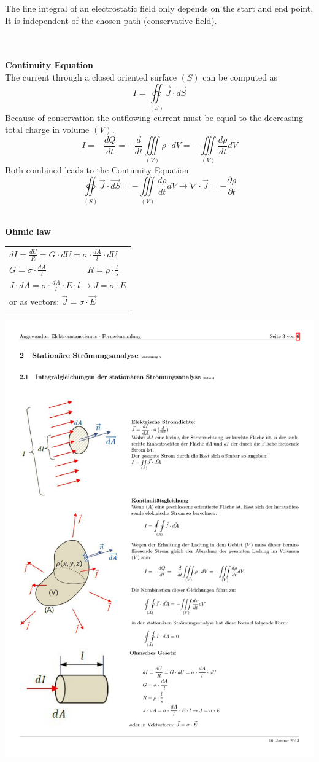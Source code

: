 The line integral of an electrostatic field only depends on the start and end point. It is independent of the chosen path (conservative field).
	
\textbf{\\ \\Continuity Equation\\}
	The current through a closed oriented surface $(S)$ can be computed as
	\begin{equation*}
		I = \oiint\limits_{\left(S\right)} \vec{J} \cdot \vec{dS}
	\end{equation*}
	Because of conservation the outflowing current must be equal to the decreasing total charge in volume $(V)$.
	\begin{equation*}
		I = -\frac{dQ}{dt} = -\frac{d}{dt}\iiint\limits_{\left(V\right)} \rho \cdot dV = -\iiint\limits_{\left(V\right)} \frac{d \rho}{dt}dV
	\end{equation*}
	Both combined leads to the Continuity Equation
	\begin{equation*}
		\oiint\limits_{\left(S\right)} \vec{J} \cdot \vec{dS} = - \iiint\limits_{\left(V\right)} \frac{d\rho}{dt}dV \rightarrow \nabla \cdot \vec{J} = -\frac{\partial \rho}{\partial t}
	\end{equation*}

\textbf{\\ Ohmic law\\}
\begin{minipage}[lt]{11cm}
	\begin{tabular}{l}
		\(\displaystyle dI = \frac{dU}{R} = G \cdot dU = \sigma \cdot \frac{dA}{l} \cdot dU \) \\
		\(\displaystyle G = \sigma \cdot \frac{dA}{l} \hspace{2cm} R = \rho \cdot \frac{l}{s} \) \\
		\(\displaystyle J \cdot dA = \sigma \cdot \frac{dA}{l} \cdot E \cdot l \rightarrow J = \sigma \cdot E \) \\
		or as vectors: \(\displaystyle \vec{J} = \sigma \cdot \vec{E}\)
	\end{tabular}
\end{minipage}
\begin{minipage}[rt]{8cm}
	\includegraphics[width=.5\textwidth]{./images/ohmic.pdf}
\end{minipage}

